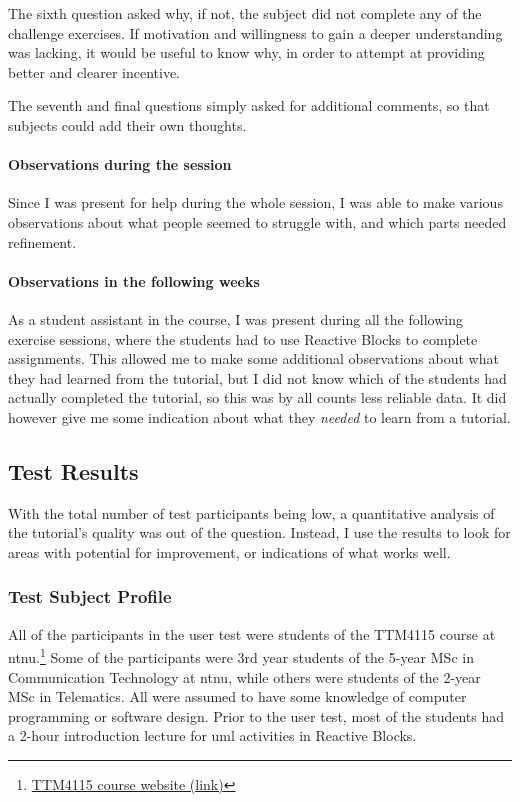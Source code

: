 \noindent
The sixth question asked why, if not, the subject did not complete any of the challenge exercises. If motivation and willingness to gain a deeper understanding was lacking, it would be useful to know why, in order to attempt at providing better and clearer incentive.

\noindent
The seventh and final questions simply asked for additional comments, so that subjects could add their own thoughts.

\paragraph{Observations during the session} Since I was present for help during the whole session, I was able to make various observations about what people seemed to struggle with, and which parts needed refinement.

\paragraph{Observations in the following weeks} As a student assistant in the course, I was present during all the following exercise sessions, where the students had to use Reactive Blocks to complete assignments. This allowed me to make some additional observations about what they had learned from the tutorial, but I did not know which of the students had actually completed the tutorial, so this was by all counts less reliable data. It did however give me some indication about what they \emph{needed} to learn from a tutorial.

\subsection{Test Results}
\label{sec:tutorial_test_results}
With the total number of test participants being low, a quantitative analysis of the tutorial's quality was out of the question. Instead, I use the results to look for areas with potential for improvement, or indications of what works well.

\subsubsection{Test Subject Profile}
All of the participants in the user test were students of the TTM4115 course at \gls{ntnu}.\footnote{\href{http://www.item.ntnu.no/academics/courses/ttm4115/start}{TTM4115 course website (link)}} Some of the participants were 3rd year students of the 5-year MSc in Communication Technology at \gls{ntnu}, while others were students of the 2-year MSc in Telematics. All were assumed to have some knowledge of computer programming or software design. Prior to the user test, most of the students had a 2-hour introduction lecture for \gls{uml} activities in Reactive Blocks.

